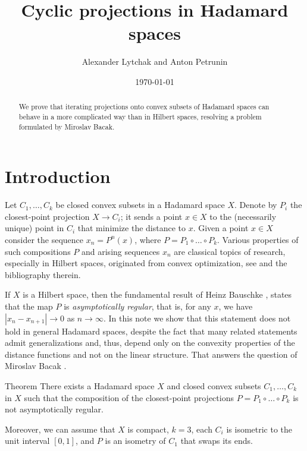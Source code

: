 \documentclass[a4paper,10pt]{article}
\def\thetitle{Cyclic projections in Hadamard spaces}
\def\theauthors{Alexander Lytchak and Anton Petrunin}
\begin{document}
\title{\thetitle}	
\author{\theauthors}
\date{\today}
\maketitle

\begin{abstract}
	We  prove that iterating projections onto convex subsets of Hadamard spaces can behave in a more complicated way than in Hilbert spaces, resolving a problem formulated by Miroslav Bacak. 	
\end{abstract}


\section{Introduction}


Let  $C_1,\dots, C_k$ be closed convex subsets in a Hadamard space $X$.
Denote by $P_i$ the closest-point projection $X\to C_i$; it sends a point $x\in X$ to the (necessarily unique) point in $C_i$ that minimize the distance to $x$.
Given a point $x\in X$ consider the sequence $x_n=P^n(x)$, where
$P= P_1\circ \dots \circ P_k$.
Various properties of such compositions  $P$ and arising  sequences $x_n$
are classical topics of research, especially in Hilbert spaces, originated from convex optimization, see \cite{Bac, Bac2, Bauschke}
and the bibliography therein.

If $X$ is a Hilbert space, then the fundamental result of Heinz Bauschke \cite{Bauschke,Kohlenbach}, states that the map $P$ is \emph{asymptotically regular}, that is, for any $x$, we have  $|x_n-x_{n+1}|\to 0$ as $n\to \infty$.
In this note we show that this statement does not hold in general Hadamard spaces, despite the fact that many related statements
admit generalizations and, thus, depend only on the convexity properties of the distance functions and not on the linear structure. 
That answers the question of Miroslav Bacak \cite[Problem 6.13]{Bac}.

\begin{thm}{Theorem}\label{thm}
There exists a Hadamard space $X$ and closed convex subsets $C_1,\dots,C_k$ in $X$ such that the composition of the closest-point projections $P= P_1\circ \dots \circ P_k$ is not asymptotically regular.

Moreover, we can assume that $X$ is compact, $k=3$, each $C_i$ is isometric to the unit interval $[0,1]$, 
and $P$ is an isometry of $C_1$ that swaps its ends.
\end{thm}
\end{document}
